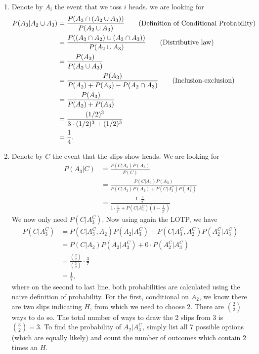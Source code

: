 

\setcounter{theorem}{20}
\begin{exercise}[BH.2.21]
\begin{solution}~
	\begin{enumerate}
		\item Denote by $A_i$ the event that we toss $i$ heads. we are looking for
		\begin{align*}
			P(A_{3}|A_{2}\cup A_{3})& = \frac{P(A_{3}\cap (A_{2}\cup A_{3}))}{P(A_{2}\cup A_{3})}\tag*{(\text{Definition of Conditional Probability})}\\
			& = \frac{P((A_{3}\cap A_{2})\cup(A_{3}\cap A_{3}))}{P(A_{2}\cup A_{3})}\tag*{(\text{Distributive law})}\\
			& = \frac{P(A_{3})}{P(A_{2}\cup A_{3})}\\
			& = \frac{P(A_{3})}{P(A_{2})+P(A_{3})-P(A_{2}\cap A_{3})}\tag*{(\text{Inclusion-exclusion})}\\
			& = \frac{P(A_{3})}{P(A_{2})+P(A_{3})}\\
			& =\frac{(1/2)^3}{3\cdot (1/2)^3 + (1/2)^3} \\
			& = \frac{1}{4}.
		\end{align*}
		\item Denote by $C$ the event that the slips show heads. We are looking for 
		\begin{align*}
			P(A_{3}|C) &= \frac{P(C|A_{3})P(A_{3})}{P(C)}\\
			&=\frac{P(C|A_{3})P(A_{3})}{P(C|A_{3})P(A_{3}) + P(C|A_{3}^{C})P(A_{3}^{C})}\\ 
			& = \frac{1\cdot \frac{1}{2^3}}{1\cdot \frac{1}{2^3} + P(C|A_{3}^{C})(1-\frac{1}{2^3})}
		\end{align*}
		We now only need $P(C|A_{3}^C)$. Now using again the LOTP, we have
		\begin{align*}
			P(C|A_{3}^{C}) &= P(C|A_{3}^{C},A_{2})P(A_{2}|A_{3}^{C}) + P(C|A_{3}^{C},A_{2}^{C})P(A_{2}^{C}|A_{3}^{C})\\
			&=P(C|A_{2})P(A_{2}|A_{3}^{C}) + 0\cdot P(A_{2}^{C}|A_{3}^{C})\\
			&=\frac{{2\choose 2}}{{3 \choose 2}}\cdot \frac{3}{7}\\
			& = \frac{1}{7},
		\end{align*}
		where on the second to last line, both probabilities are calculated using the naive definition of probability. For the first, conditional on $A_{2}$, we know there are two slips indicating $H$, from which we need to choose 2. There are ${2 \choose 2}$ ways to do so. The total number of ways to draw the 2 slips from 3 is ${3 \choose 2}=3$. To find the probability of $A_{2}|A_{3}^{C}$, simply list all 7 possible options (which are equally likely) and count the number of outcomes which contain 2 times an $H$.


\end{enumerate}
\end{solution}
\end{exercise}
